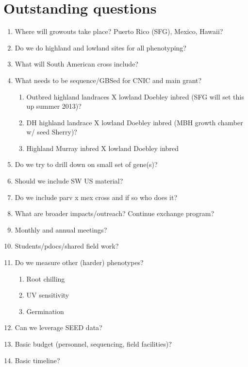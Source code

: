 \documentclass[]{article}
\begin{document}
\section*{Outstanding questions}
\begin{enumerate}
	\item Where will growouts take place?  Puerto Rico (SFG), Mexico, Hawaii?
	\item Do we do highland and lowland sites for all phenotyping?
	\item What will South American cross include? 
	\item What needs to be sequence/GBSed for CNIC and main grant? 
	\begin{enumerate}
		\item Outbred highland landraces X lowland Doebley inbred (SFG will set this up summer 2013)? 
		\item DH highland landrace X lowland Doebley inbred (MBH growth chamber w/ seed Sherry)?
		\item Highland Murray inbred X lowland Doebley inbred
	\end{enumerate}
	\item Do we try to drill down on small set of gene(s)?
	\item Should we include SW US material?
	\item Do we include parv x mex cross and if so who does it?
	\item What are broader impacts/outreach? Continue exchange program?
	\item Monthly and annual meetings?
	\item Students/pdocs/shared field work?
	\item Do we measure other (harder) phenotypes?
		\begin{enumerate}
		\item Root chilling
		\item UV sensitivity
		\item Germination
		\end{enumerate}
	\item Can we leverage SEED data?
	\item Basic budget (personnel, sequencing, field facilities)?
	\item Basic timeline?

\end{enumerate}
\end{document}
